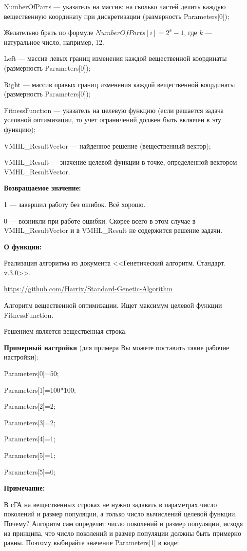 \documentclass[a4paper,12pt]{article}
\begin{document}
 NumberOfParts --- указатель на массив: на сколько частей делить каждую вещественную координату при дискретизации (размерность Parameters[0]);
 
  Желательно брать по формуле $NumberOfParts[i]=2^k-1$, где $k$ --- натуральное число, например, 12.
  
 Left --- массив левых границ изменения каждой вещественной координаты (размерность Parameters[0]);
 
 Right --- массив правых границ изменения каждой вещественной координаты (размерность Parameters[0]);
 
 FitnessFunction --- указатель на целевую функцию (если решается задача условной оптимизации, то учет ограничений должен быть включен в эту функцию);
 
 VMHL\_ResultVector --- найденное решение (вещественный вектор);
 
 VMHL\_Result --- значение целевой функции в точке, определенной вектором VMHL\_ResultVector.

\textbf{Возвращаемое значение:} 

 1 --- завершил работу без ошибок. Всё хорошо.
 
 0 --- возникли при работе ошибки. Скорее всего в этом случае в VMHL\_ResultVector и в VMHL\_Result не содержится решение задачи.

\textbf{О функции:}

Реализация алгоритма из документа <<Генетический алгоритм. Стандарт. v.3.0>>.

\href{https://github.com/Harrix/Standard-Genetic-Algorithm}{https://github.com/Harrix/Standard-Genetic-Algorithm}

Алгоритм вещественной оптимизации. Ищет максимум целевой функции FitnessFunction.

Решением является вещественная строка.

\textbf{Примерный настройки} (для примера Вы можете поставить такие рабочие настройки):

 Parameters[0]=50;
 
Parameters[1]=100*100;

Parameters[2]=2;

Parameters[3]=2;

Parameters[4]=1;

Parameters[5]=1;

Parameters[5]=0;


\textbf{Примечание:}

 В сГА на вещественных строках не нужно задавать в параметрах число поколений и размер популяции, а только число вычислений целевой функции. Почему? Алгоритм сам определит число поколений и размер популяции, исходя из принципа, что число поколений и размер популяции должны быть примерно равны. Поэтому выбирайте значение Parameters[1] в виде:
\end{document}

